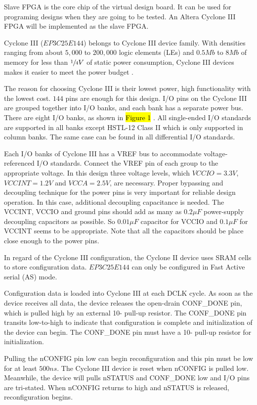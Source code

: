 Slave FPGA is the core chip of the virtual design board. It can be used for programing designs when they are going to be tested. An Altera Cyclone III FPGA will be implemented as the slave FPGA.

Cyclone III ($EP3C25E144$) belongs to Cyclone III device family. With densities ranging from about $5,000$ to $200,000$ logic elements (LEs) and $0.5Mb$ to $8Mb$ of memory for less than $\sfrac{1}{4}V$ of static power consumption, Cyclone III devices makes it easier to meet the power budget \citep{Altera:2011:cyclone3handbook}.

The reason for choosing Cyclone III is their lowest power, high functionality with the lowest cost. $144$ pins are enough for this design. I/O pins on the Cyclone III are grouped together into I/O banks, and each bank has a separate power bus. There are eight I/O banks, as shown in \hl{Figure 1} \citep{Altera:2011:cyclone3handbook}. All single-ended I/O standards are supported in all banks except HSTL-12 Class II which is only supported in column banks. The same case can be found in all differential I/O standards.


Each I/O banks of Cyclone III has a VREF bus to accommodate voltage-referenced I/O standards. Connect the VREF pin of each group to the appropriate voltage. In this design three voltage levels, which $VCCIO=3.3V$, $VCCINT= 1.2V$ and $VCCA=2.5V$, are necessary. Proper bypassing and decoupling technique for the power pins is very important for reliable design operation. In this case, additional decoupling capacitance is needed. The VCCINT, VCCIO and ground pins should add as many as $0.2\mu F$ power-supply decoupling capacitors as possible. So $0.01 \mu F$ capacitor for VCCIO and $0.1 \mu F$ for VCCINT seems to be appropriate. Note that all the capacitors should be place close enough to the power pins.

In regard of the Cyclone III configuration, the Cyclone II device uses SRAM cells to store configuration data. $EP3C25E144$ can only be configured in Fast Active serial (AS) mode.

Configuration data is loaded into Cyclone III at each DCLK cycle. As soon as the device receives all data, the device releases the open-drain CONF\_DONE pin, which is pulled high by an external 10- pull-up resistor. The CONF\_DONE pin transits low-to-high to indicate that configuration is complete and initialization of the device can begin. The CONF\_DONE pin must have a 10- pull-up resistor for initialization.

Pulling the nCONFIG pin low can begin reconfiguration and this pin must be low for at least $500ns$. The Cyclone III device is reset when nCONFIG is pulled low. Meanwhile, the device will pulls nSTATUS and CONF\_DONE low and I/O pins are tri-stated. When nCONFIG returns to high and nSTATUS is released, reconfiguration begins.

